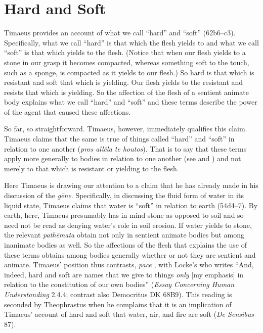 
\section{Hard and Soft} %
\label{sec:hard_and_soft}

Timaeus provides an account of what we call ``hard'' and ``soft'' (62b6--c3). Specifically, what we call ``hard'' is that which the flesh yields to and what we call ``soft'' is that which yields to the flesh. (Notice that when our flesh yields to a stone in our grasp it becomes compacted, whereas something soft to the touch, such as a sponge, is compacted as it yields to our flesh.) So hard is that which is resistant and soft that which is yielding. Our flesh yields to the resistant and resists that which is yielding. So the affection of the flesh of a sentient animate body explains what we call ``hard'' and ``soft'' and these terms describe the power of the agent that caused these affections.

So far, so straightforward. Timaeus, however, immediately qualifies this claim. Timaeus claims that the same is true of things called ``hard'' and ``soft'' in relation to one another (\emph{pros allēla te houtos}). That is to say that these terms apply more generally to bodies in relation to one another (see \citealt[228, n6]{Archer-Hind:1888qd} and \citealt[110]{OBrien:1984ji}) and not merely to that which is resistant or yielding to the flesh.

Here Timaeus is drawing our attention to a claim that he has already made in his discussion of the \emph{gēne}. Specifically, in discussing the fluid form of water in its liquid state, Timaeus claims that water is ``soft'' in relation to earth (54d4--7). By earth, here, Timaeus presumably has in mind stone as opposed to soil and so need not be read as denying water's role in soil erosion. If water yields to stone, the relevant \emph{pathēmata} obtain not only in sentient animate bodies but among inanimate bodies as well. So the affections of the flesh that explains the use of these terms obtains among bodies generally whether or not they are sentient and animate. Timaeus' position thus contrasts, \emph{pace} \citet[185, n2]{Beare:1906uq}, with Locke's who writes ``And, indeed, hard and soft are names that we give to things \emph{only} [my emphasis] in relation to the constitution of our own bodies'' (\emph{Essay Concerning Human Understanding} 2.4.4; contrast also Democritus DK 68B9). This reading is seconded by Theophrastus when he complains that it is an implication of Timaeus' account of hard and soft that water, air, and fire are soft (\emph{De Sensibus} 87).

